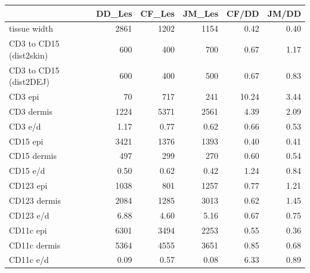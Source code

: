 \begin{tabular}{lrrrrr}
   \hline  &DD\_Les& CF\_Les& JM\_Les& CF/DD& JM/DD\\ 
\hline
tissue width & 2861 & 1202 & 1154 &  0.42 & 0.40 \\ 
  CD3 to CD15 (dist2skin) & 600 & 400 & 700 &  0.67 & 1.17 \\ 
  CD3 to CD15 (dist2DEJ) & 600 & 400 & 500 &  0.67 & 0.83 \\ 
   \hline
CD3 epi & 70 & 717 & 241 & 10.24 & 3.44 \\ 
  CD3 dermis & 1224 & 5371 & 2561 &  4.39 & 2.09 \\ 
  CD3 e/d & 1.17 & 0.77 & 0.62 &  0.66 & 0.53 \\ 
   \hline
CD15 epi & 3421 & 1376 & 1393 &  0.40 & 0.41 \\ 
  CD15 dermis & 497 & 299 & 270 &  0.60 & 0.54 \\ 
  CD15 e/d & 0.50 & 0.62 & 0.42 &  1.24 & 0.84 \\ 
   \hline
CD123 epi & 1038 & 801 & 1257 &  0.77 & 1.21 \\ 
  CD123 dermis & 2084 & 1285 & 3013 &  0.62 & 1.45 \\ 
  CD123 e/d & 6.88 & 4.60 & 5.16 &  0.67 & 0.75 \\ 
   \hline
CD11c epi & 6301 & 3494 & 2253 &  0.55 & 0.36 \\ 
  CD11c dermis & 5364 & 4555 & 3651 &  0.85 & 0.68 \\ 
  CD11c e/d & 0.09 & 0.57 & 0.08 &  6.33 & 0.89 \\ 
   \hline
\end{tabular}
